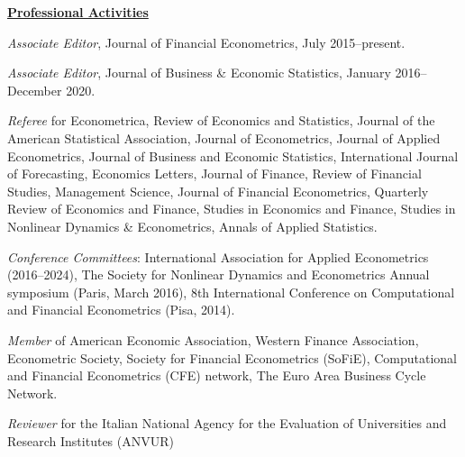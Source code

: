 \documentclass[12pt]{article}
\begin{document}
\underline{\textbf{Professional Activities}}
\begin{description}
	
\item \textit{Associate Editor}, Journal of Financial Econometrics, July 2015--present. 
\item \textit{Associate Editor}, Journal of Business \& Economic Statistics, January 2016--December 2020.

\item \emph{Referee} for Econometrica, Review of Economics and Statistics, Journal of the American Statistical Association, Journal of Econometrics, Journal of Applied Econometrics, Journal of Business and Economic Statistics, International Journal of Forecasting, Economics Letters, Journal of Finance, Review of Financial Studies, Management Science, Journal of Financial Econometrics, Quarterly Review of Economics and Finance, Studies in Economics and Finance, Studies in Nonlinear Dynamics \& Econometrics, Annals of Applied Statistics.

\item \emph{Conference Committees}: International Association for Applied Econometrics (2016--2024), The Society for Nonlinear Dynamics and Econometrics Annual symposium (Paris, March 2016), 8th International Conference on Computational and Financial Econometrics (Pisa, 2014).

\item\emph{Member} of American Economic Association, Western Finance Association, Econometric Society, Society for Financial Econometrics (SoFiE), Computational and Financial Econometrics (CFE) network, The Euro Area Business Cycle Network.

\item \emph{Reviewer} for the Italian National Agency for the Evaluation of Universities and Research Institutes (ANVUR) 
\end{description}
 
\end{document}
